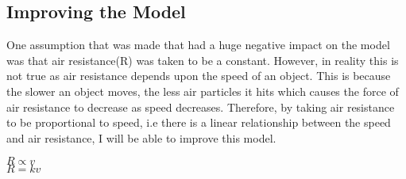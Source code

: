 \subsection{Improving the Model}
One assumption that was made that had a huge negative impact on the model was that air resistance(R) was taken to be a constant. However, in reality this is not true as air resistance depends upon the speed of an object. This is because the slower an object moves, the less air particles it hits which causes the force of air resistance to decrease as speed decreases. 
Therefore, by taking air resistance to be proportional to speed, i.e there is a linear relationship between the speed and air resistance, I will be able to improve this model.
\begin{center}
    $ R \propto v $
    \\$ R = kv $
\end{center}